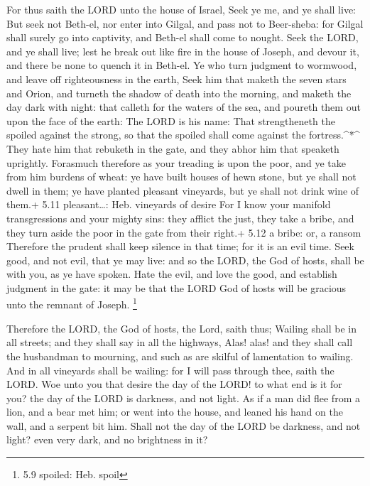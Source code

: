  For thus saith the LORD unto the house of Israel, Seek ye
me, and ye shall live:  But seek not Beth-el, nor enter into
Gilgal, and pass not to Beer-sheba: for Gilgal shall surely go into
captivity, and Beth-el shall come to nought.  Seek the LORD,
and ye shall live; lest he break out like fire in the house of Joseph,
and devour it, and there be none to quench it in Beth-el. 
Ye who turn judgment to wormwood, and leave off righteousness in the
earth,  Seek him that maketh the seven stars and Orion, and
turneth the shadow of death into the morning, and maketh the day dark
with night: that calleth for the waters of the sea, and poureth them out
upon the face of the earth: The LORD is his name:  That
strengtheneth the spoiled against the strong, so that the spoiled shall
come against the fortress.\^{}*\^{}  They hate him that
rebuketh in the gate, and they abhor him that speaketh uprightly.
 Forasmuch therefore as your treading is upon the poor, and
ye take from him burdens of wheat: ye have built houses of hewn stone,
but ye shall not dwell in them; ye have planted pleasant vineyards, but
ye shall not drink wine of them.+ 5.11 pleasant\ldots: Heb. vineyards of
desire  For I know your manifold transgressions and your
mighty sins: they afflict the just, they take a bribe, and they turn
aside the poor in the gate from their right.+ 5.12 a bribe: or, a ransom
 Therefore the prudent shall keep silence in that time; for
it is an evil time.  Seek good, and not evil, that ye may
live: and so the LORD, the God of hosts, shall be with you, as ye have
spoken.  Hate the evil, and love the good, and establish
judgment in the gate: it may be that the LORD God of hosts will be
gracious unto the remnant of Joseph. \footnote{5.9 spoiled: Heb. spoil}

 Therefore the LORD, the God of hosts, the Lord, saith
thus; Wailing shall be in all streets; and they shall say in all the
highways, Alas! alas! and they shall call the husbandman to mourning,
and such as are skilful of lamentation to wailing.  And in
all vineyards shall be wailing: for I will pass through thee, saith the
LORD.  Woe unto you that desire the day of the LORD! to
what end is it for you? the day of the LORD is darkness, and not light.
 As if a man did flee from a lion, and a bear met him; or
went into the house, and leaned his hand on the wall, and a serpent bit
him.  Shall not the day of the LORD be darkness, and not
light? even very dark, and no brightness in it?

